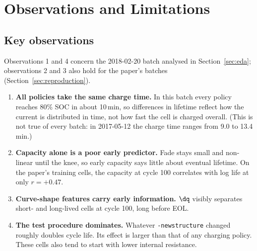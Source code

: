 \FloatBarrier
\section{Observations and Limitations}
\label{sec:discussion}

\subsection{Key observations}
Observations 1 and 4 concern the 2018-02-20 batch analysed in
Section~\ref{sec:eda}; observations 2 and 3 also hold for the paper's
batches (Section~\ref{sec:reproduction}).
\begin{enumerate}
  \item \textbf{All policies take the same charge time.} In this batch every
  policy reaches 80\% SOC in about 10\,min, so differences in lifetime
  reflect how the current is distributed in time, not how fast the cell is
  charged overall. (This is not true of every batch: in 2017-05-12 the
  charge time ranges from 9.0 to 13.4\,min.)
  \item \textbf{Capacity alone is a poor early predictor.} Fade stays small
  and non-linear until the knee, so early capacity says little about
  eventual lifetime. On the paper's training cells, the capacity at cycle
  100 correlates with log life at only $r=+0.47$.
  \item \textbf{Curve-shape features carry early information.} $\dq$ visibly
  separates short- and long-lived cells at cycle 100, long before EOL.
  \item \textbf{The test procedure dominates.} Whatever
  \texttt{-newstructure} changed roughly doubles cycle life. Its effect is
  larger than that of any charging policy. These cells also tend to start
  with lower internal resistance.
\end{enumerate}

